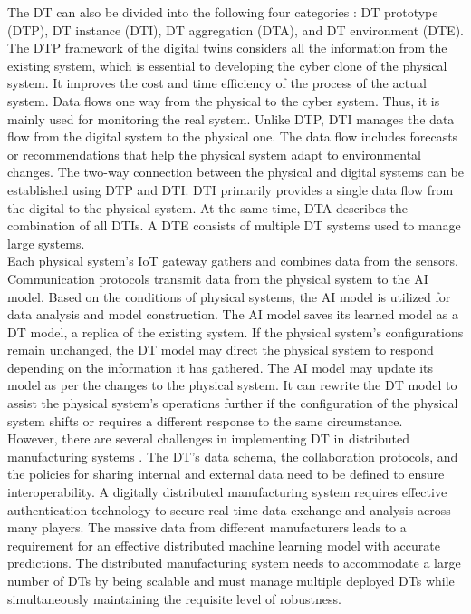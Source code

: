 \documentclass[paper=a4wide, fontsize=12pt]{scrartcl}	 %
\begin{document}
The DT can also be divided into the following four categories \cite{fi14020064}: DT prototype (DTP), DT instance (DTI), DT aggregation (DTA), and DT environment (DTE). The DTP framework of the digital twins considers all the information from the existing system, which is essential to developing the cyber clone of the physical system. It improves the cost and time efficiency of the process of the actual system. Data flows one way from the physical to the cyber system. Thus, it is mainly used for monitoring the real system. Unlike DTP, DTI manages the data flow from the digital system to the physical one. The data flow includes forecasts or recommendations that help the physical system adapt to environmental changes. The two-way connection between the physical and digital systems can be established using DTP and DTI. DTI primarily provides a single data flow from the digital to the physical system. At the same time, DTA describes the combination of all DTIs. A DTE consists of multiple DT systems used to manage large systems. \\

Each physical system's IoT gateway gathers and combines data from the sensors. Communication protocols transmit data from the physical system to the AI model. Based on the conditions of physical systems, the AI model is utilized for data analysis and model construction. The AI model saves its learned model as a DT model, a replica of the existing system. If the physical system's configurations remain unchanged, the DT model may direct the physical system to respond depending on the information it has gathered. The AI model may update its model as per the changes to the physical system. It can rewrite the DT model to assist the physical system's operations further if the configuration of the physical system shifts or requires a different response to the same circumstance. \\

However, there are several challenges in implementing DT in distributed manufacturing systems \cite{machines9090193}. The DT's data schema, the collaboration protocols, and the policies for sharing internal and external data need to be defined to ensure interoperability. A digitally distributed manufacturing system requires effective authentication technology to secure real-time data exchange and analysis across many players. The massive data from different manufacturers leads to a requirement for an effective distributed machine learning model with accurate predictions. The distributed manufacturing system needs to accommodate a large number of DTs by being scalable and must manage multiple deployed DTs while simultaneously maintaining the requisite level of robustness. \\
\end{document}
